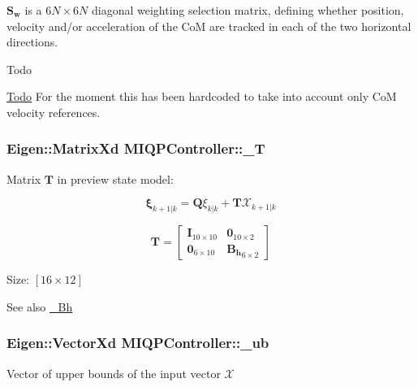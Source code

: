 $\mathbf{S_w}$ is a $6N\times6N$ diagonal weighting selection matrix, defining whether position, velocity and/or acceleration of the \-Co\-M are tracked in each of the two horizontal directions.

\begin{DoxyRefDesc}{\-Todo}
\item[\hyperlink{todo__todo000009}{\-Todo}]\-For the moment this has been hardcoded to take into account only \-Co\-M velocity references. \end{DoxyRefDesc}
\hypertarget{classMIQPController_a1143455ae85d0e221578dbe5d659af1d}{
\subsubsection[{\-\_\-\-T}]{\setlength{\rightskip}{0pt plus 5cm}\-Eigen\-::\-Matrix\-Xd {\bf \-M\-I\-Q\-P\-Controller\-::\-\_\-\-T}}}\label{classMIQPController_a1143455ae85d0e221578dbe5d659af1d}
\-Matrix $\mathbf{T}$ in preview state model\-:

\[ \mathbf{\xi}_{k+1|k} = \mathbf{Q} \xi_{k|k} + \mathbf{T}\mathcal{X}_{k+1|k} \]

\[ \mathbf{T} = \left[\begin{array}{cc} \mathbf{I}_{10\times10} & \mathbf{0}_{10\times2}\\ \mathbf{0}_{6\times10} & \mathbf{B_h}_{6\times2} \end{array}\right] \]

\-Size\-: $[16\times12]$ \begin{DoxySeeAlso}{\-See also}
\hyperlink{classMIQPController_a9a989875871a898f0ad19b441a2c67ba}{\-\_\-\-Bh} 
\end{DoxySeeAlso}
\hypertarget{classMIQPController_aa8407451ad8b20c814b12fef631f43f6}{
\subsubsection[{\-\_\-ub}]{\setlength{\rightskip}{0pt plus 5cm}\-Eigen\-::\-Vector\-Xd {\bf \-M\-I\-Q\-P\-Controller\-::\-\_\-ub}}}\label{classMIQPController_aa8407451ad8b20c814b12fef631f43f6}
\-Vector of upper bounds of the input vector $\mathcal{X}$

